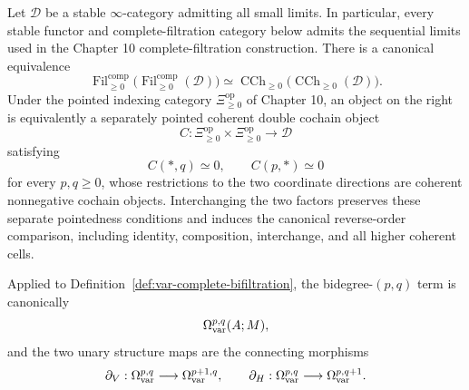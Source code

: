 \begin{lemma}
\label{lem:var-iterated-filtered-cochains}
Let \(\mathcal D\) be a stable \(\infty\)-category admitting all small limits. In particular, every stable functor and complete-filtration category below admits the sequential limits used in the Chapter 10 complete-filtration construction. There is a canonical equivalence
\[
    \operatorname{Fil}^{\mathrm{comp}}_{\ge0}
    \bigl(
      \operatorname{Fil}^{\mathrm{comp}}_{\ge0}(\mathcal D)
    \bigr)
    \simeq
    \operatorname{CCh}_{\ge0}
    \bigl(
      \operatorname{CCh}_{\ge0}(\mathcal D)
    \bigr).
\]
Under the pointed indexing category \(\Xi_{\ge0}^{\mathrm{op}}\) of Chapter 10, an object on the right is equivalently a separately pointed coherent double cochain object
\[
    C:
    \Xi_{\ge0}^{\mathrm{op}}
    \times
    \Xi_{\ge0}^{\mathrm{op}}
    \longrightarrow
    \mathcal D
\]
satisfying
\[
    C(*,q)\simeq0,
    \qquad
    C(p,*)\simeq0
\]
for every \(p,q\ge0\), whose restrictions to the two coordinate directions are coherent nonnegative cochain objects. Interchanging the two factors preserves these separate pointedness conditions and induces the canonical reverse-order comparison, including identity, composition, interchange, and all higher coherent cells.

Applied to Definition~\ref{def:var-complete-bifiltration}, the bidegree-\((p,q)\) term is canonically
\[
    \Omega_{\mathrm{var}}^{p,q}(A;M),
\]
and the two unary structure maps are the connecting morphisms
\[
    \partial_V:
    \Omega_{\mathrm{var}}^{p,q}\longrightarrow\Omega_{\mathrm{var}}^{p+1,q},
    \qquad
    \partial_H:
    \Omega_{\mathrm{var}}^{p,q}\longrightarrow\Omega_{\mathrm{var}}^{p,q+1}.
\]
\end{lemma}

